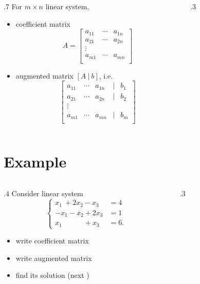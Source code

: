 \documentclass{beamer}
\theoremstyle{definition}
\theoremstyle{theorem}
\begin{document}
\begin{frame}
\begin{columns}
\begin{column}
 {.7\textwidth}
 For $m\times n$ linear system,
 \begin{itemize}
 \item   coefficient matrix
$$ A = 
\begin{bmatrix}
 a_{11} & \cdots & a_{1n} \\
 a_{21} & \cdots & a_{2n} \\
 \vdots\\
 a_{m1} & \cdots & a_{mn} \\
\end{bmatrix}
$$
\item augmented matrix 
$[A\  |\  b ]$, i.e. 
$$\begin{bmatrix}
 a_{11} & \cdots & a_{1n} & | & b_{1} \\
 a_{21} & \cdots & a_{2n} & | & b_{2} \\
 \vdots\\
 a_{m1} & \cdots & a_{mn} & | & b_{m} \\
\end{bmatrix}
$$
\end{itemize}

\end{column}
\begin{column}
 {.3\textwidth}
\end{column}
\end{columns}
\end{frame}

\section{Example}

\begin{frame}
 {}
\begin{columns}
\begin{column}
 {.4\textwidth}
Consider linear system
$$
\left\{
\begin{array}
 {ll}
  x_{1} \ + 2 x_{2} - x_{3} &= 4 \\
   - x_{1} - x_{2} +2 x_{3} &= 1 \\
  x_{1} \quad\quad\quad +  x_{3} &= 6 .
\end{array}
\right.
$$

 \begin{itemize}
 \item  write coefficient matrix
 \item write augmented matrix
 \item find its solution (next )
\end{itemize}

\end{column}
\begin{column}
 {.3\textwidth}
\end{column}
\end{columns}
\end{frame}
\end{document}
